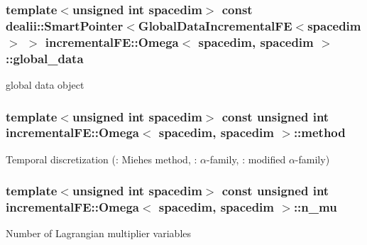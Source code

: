 \subsubsection[{\texorpdfstring{global\+\_\+data}{global_data}}]{\setlength{\rightskip}{0pt plus 5cm}template$<$unsigned int spacedim$>$ const dealii\+::\+Smart\+Pointer$<${\bf Global\+Data\+Incremental\+FE}$<$spacedim$>$ $>$ {\bf incremental\+F\+E\+::\+Omega}$<$ spacedim, spacedim $>$\+::global\+\_\+data\hspace{0.3cm}{\ttfamily [private]}}\hypertarget{classincremental_f_e_1_1_omega_3_01spacedim_00_01spacedim_01_4_afffe781a5a2032ec003032adc78e1bf3}{}\label{classincremental_f_e_1_1_omega_3_01spacedim_00_01spacedim_01_4_afffe781a5a2032ec003032adc78e1bf3}
global data object 
\subsubsection[{\texorpdfstring{method}{method}}]{\setlength{\rightskip}{0pt plus 5cm}template$<$unsigned int spacedim$>$ const unsigned int {\bf incremental\+F\+E\+::\+Omega}$<$ spacedim, spacedim $>$\+::method\hspace{0.3cm}{\ttfamily [private]}}\hypertarget{classincremental_f_e_1_1_omega_3_01spacedim_00_01spacedim_01_4_a6c95d57122261e8a2e26d3818251bc9b}{}\label{classincremental_f_e_1_1_omega_3_01spacedim_00_01spacedim_01_4_a6c95d57122261e8a2e26d3818251bc9b}
Temporal discretization ({}\+: Miehe\textquotesingle{}s method, {}\+: $\alpha$-\/family, {}\+: modified $\alpha$-\/family) 
\subsubsection[{\texorpdfstring{n\+\_\+mu}{n_mu}}]{\setlength{\rightskip}{0pt plus 5cm}template$<$unsigned int spacedim$>$ const unsigned int {\bf incremental\+F\+E\+::\+Omega}$<$ spacedim, spacedim $>$\+::n\+\_\+mu}\hypertarget{classincremental_f_e_1_1_omega_3_01spacedim_00_01spacedim_01_4_a7f1db416dd6b487504856959c7253b53}{}\label{classincremental_f_e_1_1_omega_3_01spacedim_00_01spacedim_01_4_a7f1db416dd6b487504856959c7253b53}
Number of Lagrangian multiplier variables 
